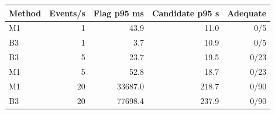 \begin{tabular}{lrrrr}
\toprule
Method & Events/s & Flag p95 ms & Candidate p95 s & Adequate \\
\midrule
M1 & 1 & 43.9 & 11.0 & 0/5 \\
B3 & 1 & 3.7 & 10.9 & 0/5 \\
B3 & 5 & 23.7 & 19.5 & 0/23 \\
M1 & 5 & 52.8 & 18.7 & 0/23 \\
M1 & 20 & 33687.0 & 218.7 & 0/90 \\
B3 & 20 & 77698.4 & 237.9 & 0/90 \\
\bottomrule
\end{tabular}
